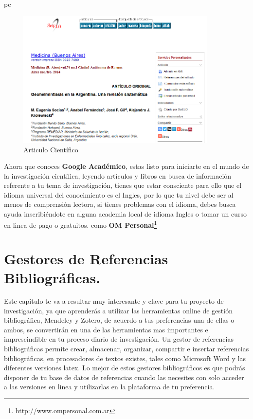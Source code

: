 pc\documentclass[a4paper,12pt,openany]{book}
\begin{document}
\begin{itemize}
\begin{figure}[H]
  \centering
	\includegraphics[width=10cm]{google4.png}
\caption{Articulo Científico}
  \label{fig:google4}
\end{figure}

Ahora que conoces \textbf{Google Académico}, estas listo para iniciarte en el mundo de la investigación científica, leyendo artículos y libros en busca de información referente a tu tema de investigación, tienes que estar consciente para ello que el idioma universal del conocimiento es el Ingles, por lo que tu nivel debe ser al menos de comprensión lectora, si tienes problemas con el idioma, debes busca ayuda inscribiéndote en alguna academia local de idioma Ingles o tomar un curso en linea de pago o gratuitos.  como \textbf{OM Personal}\footnote{http://www.ompersonal.com.ar} 

\clearpage

\chapter{Gestores de Referencias Bibliográficas.}

Este capitulo te va a resultar muy interesante y clave para tu proyecto de investigación, ya que aprenderás a utilizar las herramientas online de gestión bibliográfica, Mendeley y Zotero, de acuerdo a tus preferencias una de ellas o ambos,  se convertirán en una de las herramientas mas importantes e imprescindible en tu proceso diario de investigación. Un gestor de referencias bibliográficas permite crear, almacenar, organizar, compartir e insertar referencias bibliográficas, en procesadores de textos existes, tales como Microsoft Word y las diferentes versiones latex. Lo mejor de estos gestores bibliográficos es que podrás disponer de tu base de datos de referencias cuando las necesites con solo acceder a las versiones en linea y utilizarlas en la plataforma de tu preferencia.  


\end{itemize}
\end{document}
